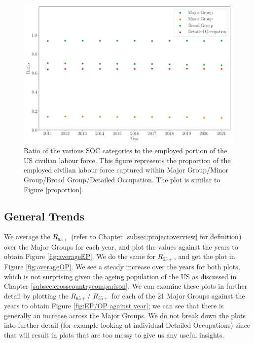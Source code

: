\documentclass[11pt]{article}
\begin{document}
\begin{figure}[!htb]
	\centering
	\includegraphics[width=15cm]{Figures/Proportion (employed) for all.png}
	\caption{Ratio of the various SOC categories to the employed portion of the US civilian labour force. This figure represents the proportion of the employed civilian labour force captured within Major Group/Minor Group/Broad Group/Detailed Occupation. The plot is similar to Figure \ref{proportion}.}
	\label{proportionemp}
\end{figure}
    
\subsection{General Trends}
\label{subsec:generaltrends}
We average the $R_{65+}$ (refer to Chapter \ref{subsec:projectoverview} for definition) over the Major Groups for each year, and plot the values against the years to obtain Figure \ref{fig:averageEP}. We do the same for  $R_{55+}$, and get the plot in Figure \ref{fig:averageOP}. We see a steady increase over the years for both plots, which is not surprising given the ageing population of the US as discussed in Chapter \ref{subsec:crosscountrycomparison}. We can examine these plots in further detail by plotting the $R_{65+}$/ $R_{55+}$ for each of the 21 Major Groups against the years to obtain Figure \ref{fig:EP/OP against year}; we can see that there is generally an increase across the Major Groups. We do not break down the plots into further detail (for example looking at individual Detailed Occupations) since that will result in plots that are too messy to give us any useful insights.
\end{document}
